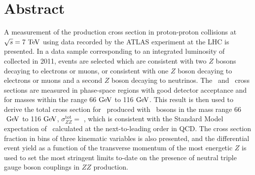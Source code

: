 \chapter*{Abstract}
A measurement of the \ZZ production cross section in proton-proton collisions
at $\sqrt{s} = 7\TeV$ using data recorded by the ATLAS experiment 
at the LHC is presented.  
In a data sample corresponding to an integrated luminosity of
\lumi collected in 2011, events are selected which are consistent with two $Z$ bosons
decaying to electrons or muons, or consistent with one $Z$ boson
decaying to electrons or muons and a second $Z$ boson decaying to
neutrinos.   The \zzllll\ and \zzllvv\ cross
sections are measured in phase-space regions with good detector acceptance
and for masses within the range 66$\GeV$ to 116$\GeV$.
This result is then used to derive the total cross section for \ZZ\
produced with \Z\ bosons in the mass range 66$\GeV$ to 116$\GeV$, $\sigma_{ZZ}^\mathrm{tot} = $ \totzz, which is consistent with the Standard Model
expectation of \theoryzzmass\ calculated at the next-to-leading order in QCD.
The cross section fraction in bins of three kinematic variables is also presented, and 
the differential event yield as a function of the transverse momentum of the most energetic $Z$ 
is used to set the most stringent limits to-date on the presence of 
neutral triple gauge boson couplings in $ZZ$ production.
